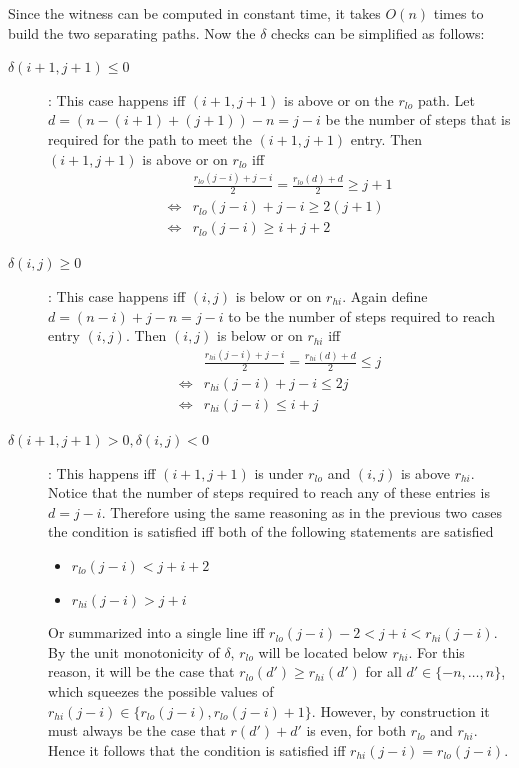\documentclass[twoside,11pt,openright]{report}
\begin{document}
Since the witness can be computed in constant time, it takes $O(n)$ times to build the two separating paths. Now the $\delta$ checks can be simplified as follows:
\begin{description}
  \item[$\delta(i + 1, j + 1) \leq 0$]: This case happens iff $(i + 1, j + 1)$ is above or on the $r_{lo}$ path. Let $d = (n - (i + 1) + (j + 1)) - n = j - i$ be the number of steps that is required for the path to meet the $(i + 1, j + 1)$ entry. Then $(i + 1, j + 1)$ is above or on $r_{lo}$ iff
  \begin{align*}
         &\frac{r_{lo}(j - i) + j - i}{2} = \frac{r_{lo}(d) + d}{2} \geq j + 1 \\
    \iff &r_{lo}(j - i) + j - i \geq 2(j + 1) \\
    \iff &r_{lo}(j - i) \geq i + j + 2
  \end{align*}

  \item[$\delta(i, j) \geq 0$]: This case happens iff $(i, j)$ is below or on $r_{hi}$. Again define $d = (n - i) + j - n = j - i$ to be the number of steps required to reach entry $(i, j)$. Then $(i, j)$ is below or on $r_{hi}$ iff
  \begin{align*}
         &\frac{r_{hi}(j - i) + j - i}{2} = \frac{r_{hi}(d) + d}{2} \leq j \\
    \iff &r_{hi}(j - i) + j - i \leq 2j \\
    \iff &r_{hi}(j - i) \leq i + j
  \end{align*}

  \item[$\delta(i + 1, j + 1) > 0, \delta(i, j) < 0$]: This happens iff $(i + 1, j + 1)$ is under $r_{lo}$ and $(i, j)$ is above $r_{hi}$. Notice that the number of steps required to reach any of these entries is $d = j - i$. Therefore using the same reasoning as in the previous two cases the condition is satisfied iff both of the following statements are satisfied
  \begin{itemize}
  \item $r_{lo}(j - i) < j + i + 2$
  \item $r_{hi}(j - i) > j + i$
  \end{itemize}
  Or summarized into a single line iff $r_{lo}(j - i) - 2 < j + i < r_{hi}(j - i)$.
  By the unit monotonicity of $\delta$, $r_{lo}$ will be located below $r_{hi}$. For this reason, it will be the case that $r_{lo}(d') \geq r_{hi}(d')$ for all $d' \in \{-n, \dots, n\}$, which squeezes the possible values of $r_{hi}(j - i) \in \{r_{lo}(j - i), r_{lo}(j - i) + 1\}$. However, by construction it must always be the case that $r(d') + d'$ is even, for both $r_{lo}$ and $r_{hi}$. Hence it follows that the condition is satisfied iff $r_{hi}(j - i) = r_{lo}(j - i)$.
\end{description}%
\end{document}
